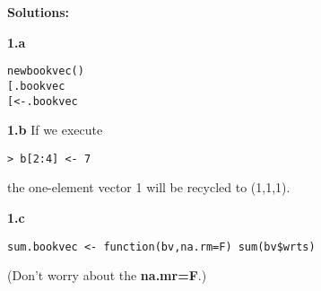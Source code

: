 \documentclass[twocolumn]{article}
\begin{document}
\onecolumn

{\bf Solutions:} 

{\bf 1.a} 

\begin{lstlisting}
newbookvec()
[.bookvec
[<-.bookvec
\end{lstlisting}

{\bf 1.b}  If we execute

\begin{lstlisting}
> b[2:4] <- 7
\end{lstlisting}

the one-element vector 1 will be recycled to (1,1,1).

{\bf 1.c}

\begin{lstlisting}
sum.bookvec <- function(bv,na.rm=F) sum(bv$wrts)
\end{lstlisting}

(Don't worry about the {\bf na.mr=F}.)
\end{document}
